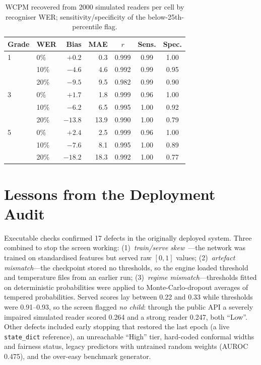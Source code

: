 \documentclass[conference]{IEEEtran}
\begin{document}
\begin{table}[!t]
\centering
\caption{WCPM recovered from 2000 simulated readers per cell by recogniser WER; sensitivity/specificity of the below-25th-percentile flag.}
\label{tab:orf}
\footnotesize
\setlength{\tabcolsep}{3pt}
\begin{tabular}{@{}llrrccc@{}}
\toprule
Grade & WER & Bias & MAE & $r$ & Sens. & Spec. \\
\midrule
1 & 0\% & $+0.2$ & 0.3 & 0.999 & 0.99 & 1.00 \\
 & 10\% & $-4.6$ & 4.6 & 0.992 & 0.99 & 0.95 \\
 & 20\% & $-9.5$ & 9.5 & 0.982 & 0.99 & 0.90 \\
3 & 0\% & $+1.7$ & 1.8 & 0.999 & 0.96 & 1.00 \\
 & 10\% & $-6.2$ & 6.5 & 0.995 & 1.00 & 0.92 \\
 & 20\% & $-13.8$ & 13.9 & 0.990 & 1.00 & 0.79 \\
5 & 0\% & $+2.4$ & 2.5 & 0.999 & 0.96 & 1.00 \\
 & 10\% & $-7.6$ & 8.1 & 0.995 & 1.00 & 0.89 \\
 & 20\% & $-18.2$ & 18.3 & 0.992 & 1.00 & 0.77 \\
\bottomrule
\end{tabular}
\end{table}

\section{Lessons from the Deployment Audit}\label{sec:audit}
Executable checks confirmed 17 defects in the originally deployed system. Three combined to stop the screen working: (1)~\emph{train/serve skew}~\cite{sculley2015}---the network was trained on standardised features but served raw $[0,1]$ values; (2)~\emph{artefact mismatch}---the checkpoint stored no thresholds, so the engine loaded threshold and temperature files from an earlier run; (3)~\emph{regime mismatch}---thresholds fitted on deterministic probabilities were applied to Monte-Carlo-dropout averages of tempered probabilities. Served scores lay between 0.22 and 0.33 while thresholds were 0.91--0.93, so the screen flagged \emph{no child}: through the public API a severely impaired simulated reader scored 0.264 and a strong reader 0.247, both ``Low''. Other defects included early stopping that restored the last epoch (a live \texttt{state\_dict} reference), an unreachable ``High'' tier, hard-coded conformal widths and fairness status, legacy predictors with untrained random weights (AUROC 0.475), and the over-easy benchmark generator.
\end{document}
